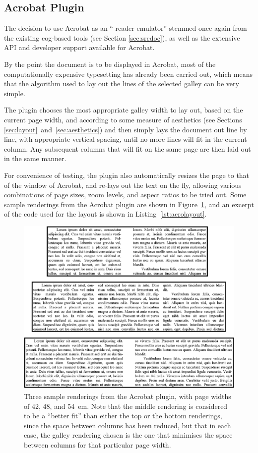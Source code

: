 \subsection{Acrobat Plugin}\label{sec:acroplugin}

The decision to use Acrobat as an ``\ebook{} reader emulator'' stemmed once again from the existing \gls{cog}-based tools (see Section \ref{sec:srcdoc}), as well as the extensive API and developer support available for Acrobat.

By the point the document is to be displayed in Acrobat, most of the computationally expensive typesetting has already been carried out, which means that the algorithm used to lay out the lines of the selected galley can be very simple.

The plugin chooses the most appropriate galley width to lay out, based on the current page width, and according to some measure of aesthetics (see Sections \ref{sec:layout}~and~\ref{sec:aesthetics}) and then simply lays the document out line by line, with appropriate vertical spacing, until no more lines will fit in the current column. Any subsequent columns that will fit on the same page are then laid out in the same manner.

For convenience of testing, the plugin also automatically resizes the page to that of the window of Acrobat, and re-lays out the text on the fly, allowing various combinations of page sizes, zoom levels, and aspect ratios to be tried out.
Some sample renderings from the Acrobat plugin are shown in Figure~\ref{fig:renderings}, and an excerpt of the code used for the layout is shown in Listing~\ref{lst:acrolayout}.

\begin{figure}
 \includegraphics[width=\textwidth]{gfx/renderings-bbox}
 \caption[Sample renderings from the Acrobat plugin]{Three sample renderings from the Acrobat plugin, with page widths of 42, 48, and 54~em. Note that the middle rendering is considered to be a ``better fit'' than either the top or the bottom renderings, since the space between columns has been reduced, but that in each case, the galley rendering chosen is the one that minimises the space between columns for that particular page width.}
 \label{fig:renderings}
\end{figure}


